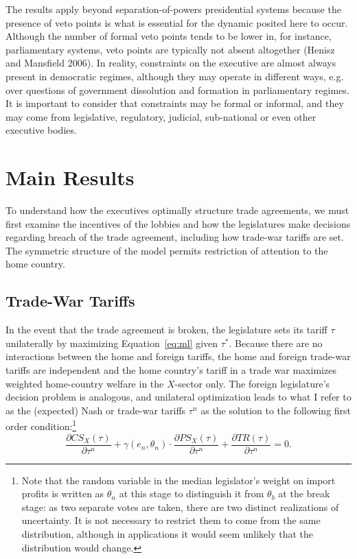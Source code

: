 \documentclass[10pt]{article}
\newcommand{\ve}{\theta}
\newcommand{\ta}{\theta}
\newcommand{\ga}{\gamma}
\begin{document}
The results apply beyond separation-of-powers presidential systems because the presence of veto points is what is essential for the dynamic posited here to occur. Although the number of formal veto points tends to be lower in, for instance, parliamentary systems, veto points are typically not absent altogether (Henisz and Mansfield 2006). In reality, constraints on the executive are almost always present in democratic regimes, although they may operate in different ways, e.g. over questions of government dissolution and formation in parliamentary regimes. It is important to consider that constraints may be formal or informal, and they may come from legislative, regulatory, judicial, sub-national or even other executive bodies.




\section{Main Results}
\label{sec:main}
To understand how the executives optimally structure trade agreements, we must first examine the incentives of the lobbies and how the legislatures make decisions regarding breach of the trade agreement, including how trade-war tariffs are set. The symmetric structure of the model permits restriction of attention to the home country.

\subsection{Trade-War Tariffs}
\label{sec:twt}
In the event that the trade agreement is broken, the legislature sets its tariff $\tau$ unilaterally by maximizing Equation~\ref{eq:ml} given $\tau^*$. Because there are no interactions between the home and foreign tariffs, the home and foreign trade-war tariffs are independent and the home country's tariff in a trade war maximizes weighted home-country welfare in the $X$-sector only. The foreign legislature's decision problem is analogous, and unilateral optimization leads to what I refer to as the (expected) Nash or trade-war tariffs $\tau^n$ as the solution to the following first order condition:\footnote{Note that the random variable in the median legislator's weight on import profits is written as $\ta_n$ at this stage to distinguish it from $\ta_b$ at the break stage: as two separate votes are taken, there are two distinct realizations of uncertainty. It is not necessary to restrict them to come from the same distribution, although in applications it would seem unlikely that the distribution would change.}
\begin{equation}
		\frac{\partial \mathit{CS}_X(\tau)}{\partial \tau^n} + \ga(e_n,\ve_n) \cdot \frac{\partial \mathit{PS}_X(\tau)}{\partial \tau^n} +  \frac{\partial \mathit{TR}(\tau)}{\partial \tau^n} = 0 .
		\label{eq:legfoc}
\end{equation}
\end{document}
